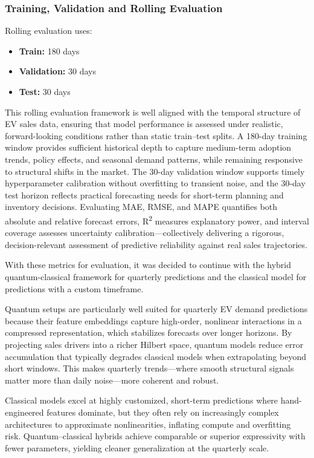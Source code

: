 \documentclass[pdflatex,sn-mathphys-num]{sn-jnl}%
\begin{document}
\subsubsection{Training, Validation and Rolling Evaluation}

Rolling evaluation uses:
\begin{itemize}
    \item \textbf{Train:} 180 days
    \item \textbf{Validation:} 30 days
    \item \textbf{Test:} 30 days
\end{itemize}

This rolling evaluation framework is well aligned with the temporal structure of EV sales data, ensuring that model performance is assessed under realistic, forward-looking conditions rather than static train–test splits. A 180-day training window provides sufficient historical depth to capture medium-term adoption trends, policy effects, and seasonal demand patterns, while remaining responsive to structural shifts in the market. The 30-day validation window supports timely hyperparameter calibration without overfitting to transient noise, and the 30-day test horizon reflects practical forecasting needs for short-term planning and inventory decisions. Evaluating MAE, RMSE, and MAPE quantifies both absolute and relative forecast errors, R\textsuperscript{2} measures explanatory power, and interval coverage assesses uncertainty calibration—collectively delivering a rigorous, decision-relevant assessment of predictive reliability against real sales trajectories.

With these metrics for evaluation, it was decided to continue with the hybrid quantum-classical framework for quarterly predictions and the classical model for predictions with a custom timeframe. 

Quantum setups are particularly well suited for quarterly EV demand predictions because their feature embeddings capture high-order, nonlinear interactions in a compressed representation, which stabilizes forecasts over longer horizons. By projecting sales drivers into a richer Hilbert space, quantum models reduce error accumulation that typically degrades classical models when extrapolating beyond short windows. This makes quarterly trends—where smooth structural signals matter more than daily noise—more coherent and robust.

Classical models excel at highly customized, short-term predictions where hand-engineered features dominate, but they often rely on increasingly complex architectures to approximate nonlinearities, inflating compute and overfitting risk. Quantum–classical hybrids achieve comparable or superior expressivity with fewer parameters, yielding cleaner generalization at the quarterly scale.
\end{document}

